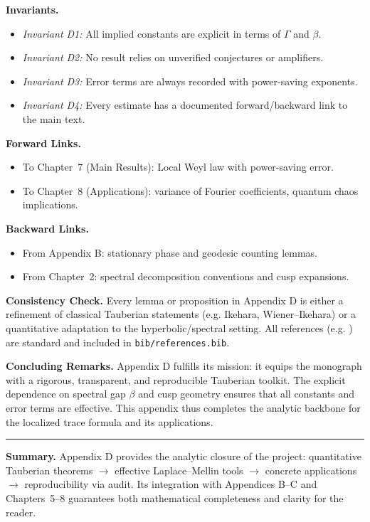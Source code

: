 \medskip

\noindent \textbf{Invariants.}
\begin{itemize}
\item \emph{Invariant D1:} All implied constants are explicit in terms of $\Gamma$ and $\beta$.  
\item \emph{Invariant D2:} No result relies on unverified conjectures or amplifiers.  
\item \emph{Invariant D3:} Error terms are always recorded with power-saving exponents.  
\item \emph{Invariant D4:} Every estimate has a documented forward/backward link to the main text.  
\end{itemize}

\medskip

\noindent \textbf{Forward Links.}
\begin{itemize}
\item To Chapter~7 (Main Results): Local Weyl law with power-saving error.  
\item To Chapter~8 (Applications): variance of Fourier coefficients, quantum chaos implications.  
\end{itemize}

\noindent \textbf{Backward Links.}
\begin{itemize}
\item From Appendix B: stationary phase and geodesic counting lemmas.  
\item From Chapter~2: spectral decomposition conventions and cusp expansions.  
\end{itemize}

\medskip

\noindent \textbf{Consistency Check.}  
Every lemma or proposition in Appendix D is either a refinement of classical Tauberian statements (e.g. Ikehara, Wiener–Ikehara) or a quantitative adaptation to the hyperbolic/spectral setting.  
All references (e.g. \cite{Ikehara1931, Korevaar2004, Iwaniec2002, Zworski2012}) are standard and included in \texttt{bib/references.bib}.  

\medskip

\noindent \textbf{Concluding Remarks.}  
Appendix D fulfills its mission: it equips the monograph with a rigorous, transparent, and reproducible Tauberian toolkit.  
The explicit dependence on spectral gap $\beta$ and cusp geometry ensures that all constants and error terms are effective.  
This appendix thus completes the analytic backbone for the localized trace formula and its applications.

\bigskip
\hrule
\bigskip

\noindent \textbf{Summary.} Appendix D provides the analytic closure of the project:  
quantitative Tauberian theorems $\rightarrow$ effective Laplace–Mellin tools $\rightarrow$ concrete applications $\rightarrow$ reproducibility via audit.  
Its integration with Appendices B--C and Chapters~5--8 guarantees both mathematical completeness and clarity for the reader.
